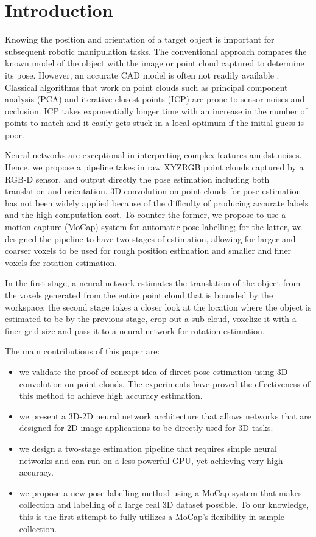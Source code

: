 \documentclass[conference]{IEEEtran}
\begin{document}
\section{Introduction}
Knowing the position and orientation of a target object is important for subsequent robotic manipulation tasks. The conventional approach compares the known model of the object with the image or point cloud captured to determine its pose. However, an accurate CAD model is often not readily available \cite{saxena_2008_ijrr}. Classical algorithms that work on point clouds such as principal component analysis (PCA) and iterative closest points (ICP) are prone to sensor noises and occlusion. ICP takes exponentially longer time with an increase in the number of points to match and it easily gets stuck in a local optimum if the initial guess is poor.

Neural networks are exceptional in interpreting complex features amidst noises. Hence, we propose a pipeline takes in raw XYZRGB point clouds captured by a RGB-D sensor, and output directly the pose estimation including both translation and orientation. 3D convolution on point clouds for pose estimation has not been widely applied because of the difficulty of producing accurate labels and the high computation cost. To counter the former, we propose to use a motion capture (MoCap) system for automatic pose labelling; for the latter, we designed the pipeline to have two stages of estimation, allowing for larger and coarser voxels to be used for rough position estimation and smaller and finer voxels for rotation estimation.

In the first stage, a neural network estimates the translation of the object from the voxels generated from the entire point cloud that is bounded by the workspace; the second stage takes a closer look at the location where the object is estimated to be by the previous stage, crop out a sub-cloud, voxelize it with a finer grid size and pass it to a neural network for rotation estimation.

The main contributions of this paper are:
\begin{itemize}
	\item we validate the proof-of-concept idea of direct pose estimation using 3D convolution on point clouds. The experiments have proved the effectiveness of this method to achieve high accuracy estimation.
	\item we present a 3D-2D neural network architecture that allows networks that are designed for 2D image applications to be directly used for 3D tasks.
	\item we design a two-stage estimation pipeline that requires simple neural networks and can run on a less powerful GPU, yet achieving very high accuracy.
	\item we propose a new pose labelling method using a MoCap system that makes collection and labelling of a large real 3D dataset possible. To our knowledge, this is the first attempt to fully utilizes a MoCap's flexibility in sample collection.
\end{itemize}
\end{document}
